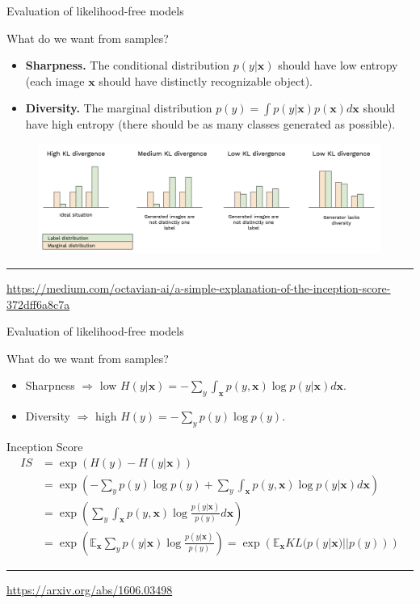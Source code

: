 \documentclass{beamer}
\newcommand{\bx}{\mathbf{x}}
\newcommand{\bbE}{\mathbb{E}}
\begin{document}
\begin{frame}{Evaluation of likelihood-free models}
	\begin{block}{What do we want from samples?}
		\begin{itemize}
			\item \textbf{Sharpness.}
			The conditional distribution $p(y | \bx)$ should have low entropy (each image $\bx$ should have distinctly recognizable object).
			\item \textbf{Diversity.}
			The marginal distribution $p(y) = \int p(y | \bx) p(\bx) d \bx$ should have high entropy (there should be as many classes generated as possible).
		\end{itemize}
	\end{block}
	\begin{figure}
		\centering
		\includegraphics[width=1.0\linewidth]{figs/is_toy}
	\end{figure}
	\vfill
	\hrule\medskip 
	{\scriptsize \href{https://medium.com/octavian-ai/a-simple-explanation-of-the-inception-score-372dff6a8c7a}{https://medium.com/octavian-ai/a-simple-explanation-of-the-inception-score-372dff6a8c7a}}
\end{frame}
\begin{frame}{Evaluation of likelihood-free models}
		\begin{block}{What do we want from samples?}
		\begin{itemize}
			\item Sharpness $\Rightarrow$ low $H(y | \bx) = - \sum_{y} \int_{\bx} p(y, \bx) \log p(y | \bx) d\bx$.
			\item Diversity $\Rightarrow$ high $H(y)  = - \sum_{y} p(y) \log p(y)$.
		\end{itemize}
	\end{block}
	\begin{block}{Inception Score}
		\vspace{-0.3cm}
		\footnotesize
		\begin{align*}
			IS &= \exp(H(y) - H(y | \bx)) \\ 
			&= \exp \left( - \sum_{y} p(y) \log p(y) + \sum_{y} \int_{\bx} p(y, \bx) \log p(y | \bx) d\bx\right) \\
			&= \exp \left( \sum_{y} \int_{\bx} p(y, \bx) \log \frac{p(y | \bx)}{p(y)} d\bx\right) \\ 
			&= \exp \left( \bbE_{\bx} \sum_{y} p(y | \bx) \log \frac{p(y | \bx)}{p(y)} \right) = \exp \left( \bbE_{\bx} KL(p(y | \bx) || p(y)) \right)
		\end{align*}
	\end{block}
	\vfill
	\hrule\medskip 
	{\scriptsize \href{https://arxiv.org/abs/1606.03498}{https://arxiv.org/abs/1606.03498}}
\end{frame}
\end{document}
